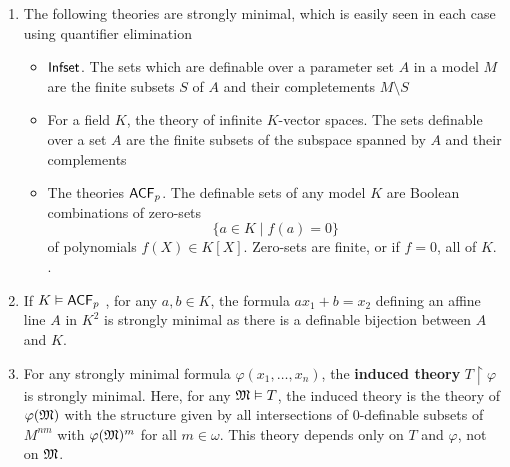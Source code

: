 \documentclass[11pt]{article}
\begin{document}
\begin{examplle}[]
\begin{enumerate}
\item The following theories are strongly minimal, which is easily seen in each case using
quantifier elimination
\begin{itemize}
\item \(\operatorname{\textsf{Infset}}\). The sets which are definable over a parameter set \(A\) in a model \(M\) are
the finite subsets \(S\) of \(A\) and their completements \(M\setminus S\)
\item For a field \(K\), the theory of infinite \(K\)-vector spaces. The sets definable over a
set \(A\) are the finite subsets of the subspace spanned by \(A\) and their complements
\label{Problem3}
\item The theories \(\textsf{ACF}_p\). The definable sets of any model \(K\) are Boolean combinations of
zero-sets
\begin{equation*}
\{a\in K\mid f(a)=0\}
\end{equation*}
of polynomials \(f(X)\in K[X]\). Zero-sets are finite, or if \(f=0\), all of \(K\).
.
\end{itemize}
\item If \(K\vDash\textsf{ACF}_p\) , for any \(a,b\in K\), the formula \(ax_1+b=x_2\) defining an affine line \(A\)
in \(K^2\) is strongly minimal as there is a definable bijection between \(A\) and \(K\).
\item For any strongly minimal formula \(\varphi(x_1,\dots,x_n)\), the \textbf{induced theory} \(T\restriction\varphi\) is
strongly minimal. Here, for any \(\mathfrak{M}\vDash T\), the induced theory is the theory of \(\varphi(\mathfrak{M})\) with
the structure given by all intersections of 0-definable subsets of \(M^{nm}\) with \(\varphi(\mathfrak{M})^m\)
for all \(m\in\omega\). This theory depends only on \(T\) and \(\varphi\), not on \(\mathfrak{M}\). \label{Problem4}
\end{enumerate}
\end{examplle}
\end{document}
